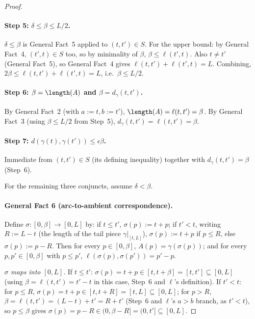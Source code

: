 \begin{proof}
  \paragraph{Step 5: $\delta \le \beta \le L/2$.} $\delta\le\beta$ is General Fact~5 applied to
  $(t,t')\in S$. For the upper bound: by General Fact~4, $(t',t)\in S$ too, so by minimality of
  $\beta$, $\beta \le \ell(t',t)$. Also $t\ne t'$ (General Fact~5), so General Fact~4 gives
  $\ell(t,t')+\ell(t',t)=L$. Combining, $2\beta \le \ell(t,t')+\ell(t',t) = L$, i.e.\ $\beta \le
  L/2$.

  \paragraph{Step 6: $\beta = \length(A)$ and $\beta = d_\gamma(t,t')$.} By General Fact~2 (with
  $a:=t,b:=t'$), $\length(A) = \ell(t,t') = \beta$. By General Fact~3 (using $\beta \le L/2$ from
  Step~5), $d_\gamma(t,t') = \ell(t,t') = \beta$.

  \paragraph{Step 7: $d(\gamma(t),\gamma(t')) \le \epsilon\beta$.} Immediate from $(t,t')\in S$
  (its defining inequality) together with $d_\gamma(t,t')=\beta$ (Step~6).

  For the remaining three conjuncts, assume $\delta < \beta$.

  \paragraph{General Fact 6 (arc-to-ambient correspondence).} Define $\sigma : [0,\beta] \to [0,L]$
  by: if $t\le t'$, $\sigma(p) := t+p$; if $t'<t$, writing $R:=L-t$ (the length of the tail piece
  $\gamma|_{[t,L]}$), $\sigma(p) := t+p$ if $p\le R$, else $\sigma(p) := p-R$. Then for every $p \in
  [0,\beta]$, $A(p) = \gamma(\sigma(p))$; and for every $p,p'\in[0,\beta]$ with $p \le p'$,
  $\ell(\sigma(p),\sigma(p')) = p'-p$.

  \emph{$\sigma$ maps into $[0,L]$.} If $t\le t'$: $\sigma(p)=t+p \in [t,t+\beta]=[t,t']\subseteq
  [0,L]$ (using $\beta = \ell(t,t') = t'-t$ in this case, Step~6 and $\ell$'s definition). If
  $t'<t$: for $p\le R$, $\sigma(p)=t+p\in[t,t+R]=[t,L]\subseteq[0,L]$; for $p>R$, $\beta =
  \ell(t,t')=(L-t)+t'=R+t'$ (Step~6 and $\ell$'s $a>b$ branch, as $t'<t$), so $p \le \beta$ gives
  $\sigma(p)=p-R \in (0,\beta-R]=(0,t']\subseteq[0,L]$.


\end{proof}

